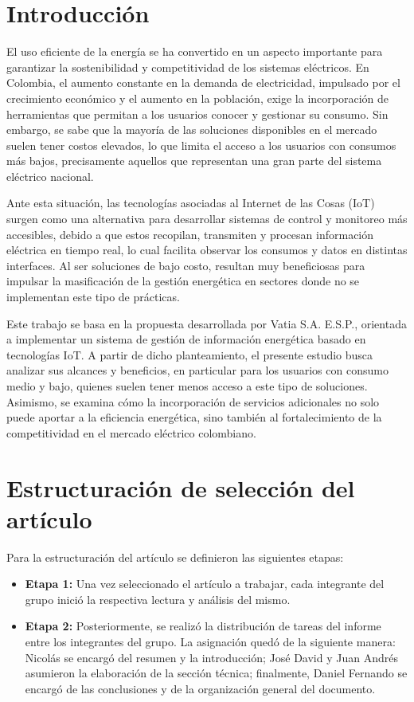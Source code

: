 \section{Introducción}
El uso eficiente de la energía se ha convertido en un aspecto importante para garantizar la sostenibilidad y competitividad de los sistemas eléctricos. En Colombia, el aumento constante en la demanda de electricidad, impulsado por el crecimiento económico y el aumento en la población, exige la incorporación de herramientas que permitan a los usuarios conocer y gestionar su consumo. Sin embargo, se sabe que la mayoría de las soluciones disponibles en el mercado suelen tener costos elevados, lo que limita el acceso a los usuarios con consumos más bajos, precisamente aquellos que representan una gran parte del sistema eléctrico nacional.

Ante esta situación, las tecnologías asociadas al Internet de las Cosas (IoT) surgen como una alternativa para desarrollar sistemas de control y monitoreo más accesibles, debido a que estos recopilan, transmiten y procesan información eléctrica en tiempo real, lo cual facilita observar los consumos y datos en distintas interfaces. Al ser soluciones de bajo costo, resultan muy beneficiosas para impulsar la masificación de la gestión energética en sectores donde no se implementan este tipo de prácticas.

Este trabajo se basa en la propuesta desarrollada por Vatia S.A. E.S.P., orientada a implementar un sistema de gestión de información energética basado en tecnologías IoT. A partir de dicho planteamiento, el presente estudio busca analizar sus alcances y beneficios, en particular para los usuarios con consumo medio y bajo, quienes suelen tener menos acceso a este tipo de soluciones. Asimismo, se examina cómo la incorporación de servicios adicionales no solo puede aportar a la eficiencia energética, sino también al fortalecimiento de la competitividad en el mercado eléctrico colombiano.

\section{Estructuración de selección del artículo}
Para la estructuración del artículo se definieron las siguientes etapas:

\begin{itemize}
    \item \textbf{Etapa 1:} Una vez seleccionado el artículo a trabajar, cada integrante del grupo inició la respectiva lectura y análisis del mismo.
    \item \textbf{Etapa 2:} Posteriormente, se realizó la distribución de tareas del informe entre los integrantes del grupo. La asignación quedó de la siguiente manera: Nicolás se encargó del resumen y la introducción; José David y Juan Andrés asumieron la elaboración de la sección técnica; finalmente, Daniel Fernando se encargó de las conclusiones y de la organización general del documento.
\end{itemize}

